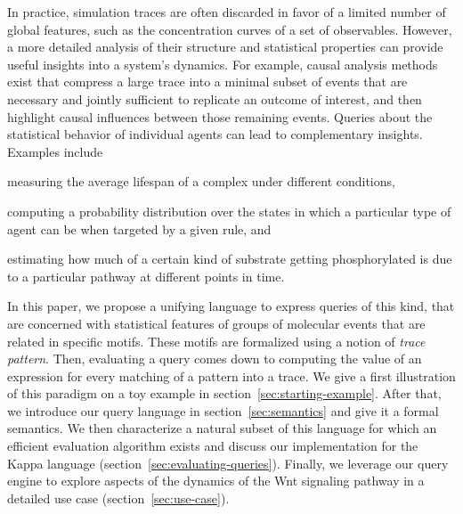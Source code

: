 \documentclass[runningheads]{llncs}
\begin{document}
In practice, simulation traces are often discarded in favor of a
limited number of global features, such
as the concentration curves of a set of observables. However, a more
detailed analysis of their structure and statistical properties can
provide useful insights into a system's dynamics. For example, causal
analysis methods exist
\cite{DanosEtAl-CONCUR07,DBLP:conf/fsttcs/DanosFFHH12} that compress a
large trace into a minimal subset of events that are necessary and
jointly sufficient to replicate an outcome of interest, and then
highlight causal influences between those remaining events.
Queries about the statistical behavior of individual agents can
lead to complementary insights. Examples include
\begin{inparaenum}[(i)]
\item measuring the average lifespan of a complex under different
  conditions,
\item computing a probability distribution over the states in which a
  particular type of agent can be when targeted by a given rule, and
\item estimating how much of a certain kind of substrate getting
  phosphorylated is due to a particular pathway at different points in
  time.
\end{inparaenum}

In this paper, we propose a unifying language to express queries of
this kind, that are concerned with statistical features of groups of
molecular events that are related in specific motifs. These motifs are
formalized using a notion of \emph{trace pattern}. Then, evaluating a
query comes down to computing the value of an expression for every
matching of a pattern into a trace. We give a first illustration of
this paradigm on a toy example in
section~\ref{sec:starting-example}. After that, we introduce our query
language in section~\ref{sec:semantics} and give it a formal
semantics. We then characterize a natural subset of this language for
which an efficient evaluation algorithm exists and discuss our
implementation for the Kappa language
(section~\ref{sec:evaluating-queries}). Finally, we leverage our query
engine to explore aspects of the dynamics of the Wnt signaling pathway
in a detailed use case (section~\ref{sec:use-case}).

\end{document}
